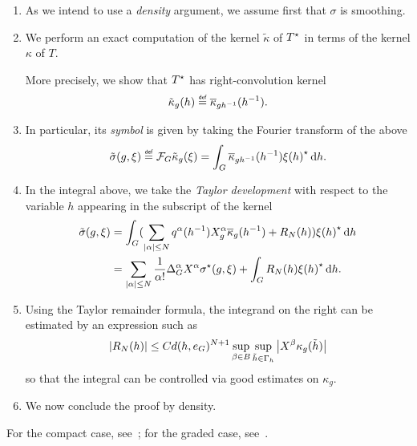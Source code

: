 \begin{enumerate}
    \item As we intend to use a \emph{density} argument,
        we assume first that $\sigma$ is smoothing.
    \item We perform an exact computation of the kernel $\tilde \kappa$ of ${T}^\star$ in terms of the kernel $\kappa$ of $T$.

        More precisely, we show that ${T}^\star$ has right-convolution kernel
        \begin{align*}
            \tilde \kappa_g(h) \defeq \conj \kappa_{g h^{-1}}(h^{-1}).
        \end{align*}
    \item
        In particular, its \emph{symbol} is given by taking the Fourier transform of the above
        \begin{align*}
            \tilde \sigma(g, \xi) \defeq \Fourier \tilde \kappa_g(\xi)
            = \int_\Group \conj \kappa_{g h^{-1}}(h^{-1}) \adj{\xi(h)} \dd h.
        \end{align*}
    \item
        In the integral above,
        we take the \emph{Taylor development} with respect to the variable $h$ appearing in the subscript of the kernel
        \begin{align*}
            \tilde \sigma(g, \xi)
            &= \int_\Group (\sum_{\abs \alpha \leq N} q^{\alpha}(h^{-1}) \LeftDifferentialOperator [g] \alpha \conj \kappa_{g}(h^{-1}) + R_N(h)) \adj{\xi(h)} \dd h\\
            &= \sum_{\abs \alpha \leq N} \frac 1 {\alpha!} \DifferenceOperatorOrder \alpha \LeftDifferentialOperator \alpha \adj \sigma(g, \xi) + \int_\Group R_N(h) \adj{\xi(h)} \dd h.
        \end{align*}
    \item
        Using the Taylor remainder formula,
        the integrand on the right can be estimated by an expression such as
        \begin{align*}
            \abs {R_N(h)}
            \leq C d(h, e_\Group)^{N + 1} \sup_{\beta \in B} \sup_{\tilde h \in \Gamma_h} \abs {\LeftDifferentialOperator \beta \kappa_g(\tilde h)}
        \end{align*}
        so that the integral can be controlled via good estimates on $\kappa_g$.
    \item
        We now conclude the proof by density.
\end{enumerate}

For the compact case,
see~\cite[Sections 6.3 and 7.3]{Fischer2015};
for the graded case,
see~\cite[Sections 5.4 and 5.5]{FischerRuzhansky16}.
